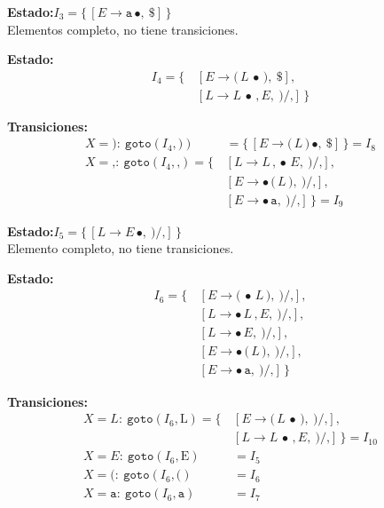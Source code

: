 \documentclass[12pt,letterpaper]{article}
\newcommand{\nt}[1]{\textit{#1}}
\newcommand{\tk}[1]{\texttt{#1}}
\newcommand{\tx}[1]{\text{#1}}
\begin{document}
\begin{enumerate}[label=\arabic*.]
  \medskip

  \textbf{Estado:}\quad $I_3 = \{\,[\nt{E}\to\tk{a}\,\bullet,\ \tk{\$}]\,\}$\\
  Elementos completo, no tiene transiciones.

  \medskip

  \textbf{Estado:}
  \[
  \begin{aligned}
    I_4 =  \{\, & [\nt{E}\to\tk{(}\,\nt{L}\,\bullet\,\tk{)},\ \tk{\$}],\\
                & [\nt{L}\to\nt{L}\,\bullet\,\tk{,}\,\nt{E},\ \tk{)}/\tk{,}]\,\}
    \end{aligned}
  \]

  \textbf{Transiciones:}
  \[
  \begin{aligned}
    X=\tk{)}:\ \texttt{goto}(I_4,\tk{)}) &= \{\,[\nt{E}\to\tk{(}\,\nt{L}\,\tk{)}\,\bullet,\ \tk{\$}]\,\} = \boxed{I_8}\\[6pt]
    X=\tk{,}:\ \texttt{goto}(I_4,\tk{,}) = \{\, & [\nt{L}\to\nt{L}\,\tk{,}\,\bullet\,\nt{E},\ \tk{)}/\tk{,}],\\
                                              & [\nt{E}\to\bullet\,\tk{(}\,\nt{L}\,\tk{)},\ \tk{)}/\tk{,}],\\
                                              & [\nt{E}\to\bullet\,\tk{a},\ \tk{)}/\tk{,}]\,\} = \boxed{I_9}
  \end{aligned}
  \]

  \medskip

  \textbf{Estado:}\quad $I_5 = \{\,[\nt{L}\to\nt{E}\,\bullet,\ \tk{)}/\tk{,}]\,\}$\\
  Elemento completo, no tiene transiciones.

  \medskip

  \textbf{Estado:}
  \[
  \begin{aligned}
    I_6 = \{\, & [\nt{E}\to\tk{(}\,\bullet\,\nt{L}\,\tk{)},\ \tk{)}/\tk{,}],\\
               & [\nt{L}\to\bullet\,\nt{L}\,\tk{,}\,\nt{E},\ \tk{)}/\tk{,}],\\
               & [\nt{L}\to\bullet\,\nt{E},\ \tk{)}/\tk{,}],\\
               & [\nt{E}\to\bullet\,\tk{(}\,\nt{L}\,\tk{)},\ \tk{)}/\tk{,}],\\
               & [\nt{E}\to\bullet\,\tk{a},\ \tk{)}/\tk{,}]\,\}
    \end{aligned}
  \]

  \textbf{Transiciones:}
  \[
  \begin{aligned}
    X=\nt{L}:\ \texttt{goto}(I_6,\tx{L}) = \{\, & [\nt{E}\to\tk{(}\,\nt{L}\,\bullet\,\tk{)},\ \tk{)}/\tk{,}],\\
                                              & [\nt{L}\to\nt{L}\,\bullet\,\tk{,}\,\nt{E},\ \tk{)}/\tk{,}]\,\} = \boxed{I_{10}}\\[6pt]
    X=\nt{E}:\ \texttt{goto}(I_6,\tx{E}) &= I_5\\[3pt]
    X=\tk{(}:\ \texttt{goto}(I_6,\tk{(}) &= I_6\\[3pt]
    X=\tk{a}:\ \texttt{goto}(I_6,\tk{a}) &= I_7
  \end{aligned}
  \]


\end{enumerate}
\end{document}
